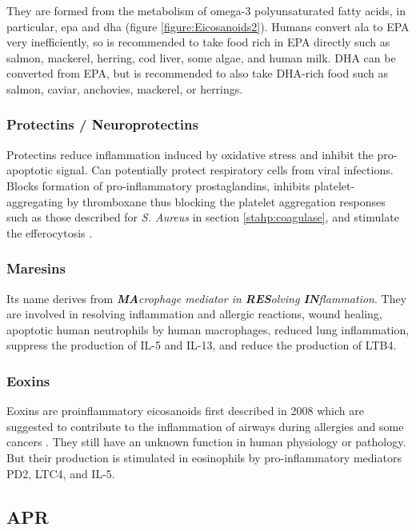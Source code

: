 They are formed from the metabolism of omega-3 polyunsaturated fatty acids, in particular, \gls{epa} and \gls{dha} (figure \ref{figure:Eicosanoids2}). Humans convert \gls{ala} to EPA very inefficiently, so is recommended to take food rich in EPA directly such as salmon, mackerel, herring, cod liver, some algae, and human milk. DHA can be converted from EPA, but is recommended to also take DHA-rich food such as salmon, caviar, anchovies, mackerel, or herrings.

\subsubsection{Protectins / Neuroprotectins }

Protectins reduce inflammation induced by oxidative stress and inhibit the pro-apoptotic signal. Can potentially protect respiratory cells from viral infections. Blocks formation of pro-inflammatory prostaglandins, inhibits platelet-aggregating by thromboxane thus blocking the platelet aggregation responses such as those described for \textit{S. Aureus} in section \ref{stahp:coagulase}, and stimulate the efferocytosis \cite{Lagarde2014, Serhan2015}.

\subsubsection{Maresins}

Its name derives from \textit{\textbf{MA}crophage mediator in \textbf{RES}olving \textbf{IN}flammation}. They are involved in resolving inflammation and allergic reactions, wound healing, apoptotic human neutrophils by human macrophages, reduced lung inflammation, suppress the production of IL-5 and IL-13, and reduce the production of LTB4.

\subsubsection{Eoxins}

Eoxins are proinflammatory eicosanoids first described in 2008 \cite{Feltenmark2008} which are suggested to contribute to the inflammation of airways during allergies and some cancers \cite{Claesson2009}. They still have an unknown function in human physiology or pathology. But their production is stimulated in eosinophils by pro-inflammatory mediators PD2, LTC4, and IL-5.

\subsection{APR}

